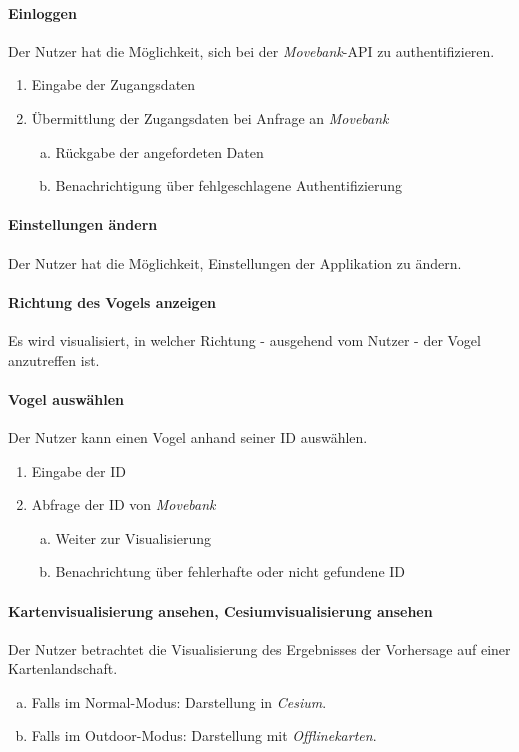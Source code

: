 \documentclass[12pt]{article} %
\newenvironment{cptenumerate}[1][label=\arabic*.]{\begin{enumerate}[#1] \setlength\itemsep{0em}}{\end{enumerate}}
\begin{document}
\paragraph{Einloggen} Der Nutzer hat die Möglichkeit, sich bei der \textit{Movebank}-API zu authentifizieren.
\begin{cptenumerate} 
  	 \item Eingabe der Zugangsdaten
  	 \item Übermittlung der Zugangsdaten bei Anfrage an \textit{Movebank}
  	 \begin{cptenumerate}[a.]
  	  	 \item Rückgabe der angefordeten Daten
  	  	 \item Benachrichtigung über fehlgeschlagene Authentifizierung
  	 \end{cptenumerate} 
 \end{cptenumerate}  

 \paragraph{Einstellungen ändern} Der Nutzer hat die Möglichkeit, Einstellungen der Applikation zu ändern.

 \paragraph{Richtung des Vogels anzeigen} Es wird visualisiert, in welcher Richtung - ausgehend vom Nutzer - der Vogel anzutreffen ist.

 \paragraph{Vogel auswählen} Der Nutzer kann einen Vogel anhand seiner ID auswählen.
 \begin{cptenumerate} 
     	 \item Eingabe der ID
     	 \item Abfrage der ID von \textit{Movebank}
     	 \begin{cptenumerate}[a.]
     	   	 \item Weiter zur Visualisierung
     	   	 \item Benachrichtung über fehlerhafte oder nicht gefundene ID
     	  \end{cptenumerate}  
    \end{cptenumerate}    

\paragraph{Kartenvisualisierung ansehen, Cesiumvisualisierung ansehen} Der Nutzer betrachtet die Visualisierung des Ergebnisses der Vorhersage auf einer Kartenlandschaft.
\begin{cptenumerate}[a.]
 	 \item Falls im Normal-Modus: Darstellung in \textit{Cesium}.
 	 \item Falls im Outdoor-Modus: Darstellung mit \textit{Offlinekarten}. 
\end{cptenumerate}
\end{document}
